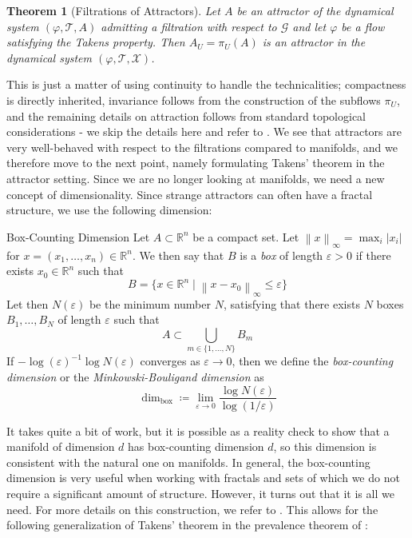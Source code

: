 \documentclass[11pt, a4paper]{memoir}
\theoremstyle{break}
\newtheorem{thm}{Theorem}
\theoremstyle{break}
\theoremstyle{nonumberplain}
\newcommand{\mR}{\mathbb{R}}
\newcommand{\norm}[1]{\left\lVert#1\right\rVert}
\begin{document}
\begin{thm}[Filtrations of Attractors]
Let $A$ be an attractor of the dynamical system $(\varphi, \mathcal{T}, A)$ admitting a filtration with respect to $\mathcal{G}$ and let $\varphi$ be a flow satisfying the Takens property. Then $A_U=\pi_U(A)$ is an attractor in the dynamical system $(\varphi, \mathcal{T},\mathcal{X})$.
\end{thm}
This is just a matter of using continuity to handle the technicalities; compactness is directly inherited, invariance follows from the construction of the subflows $\pi_U$, and the remaining details on attraction follows from standard topological considerations - we skip the details here and refer to \cite{mathFound}. We see that attractors are very well-behaved with respect to the filtrations compared to manifolds, and we therefore move to the next point, namely formulating Takens' theorem in the attractor setting. Since we are no longer looking at manifolds, we need a new concept of dimensionality. Since strange attractors can often have a fractal structure, we use the following dimension:
\begin{mydefinition}{Box-Counting Dimension}
Let $A\subset \mR^n$ be a compact set. Let $\norm{x}_{\infty}=\max_ i |x_i|$ for $x=(x_1,\ldots,x_n)\in \mR^n$. We then say that $B$ is a \emph{box} of length $\varepsilon>0$ if there exists $x_0\in \mR^n$ such that $$B=\{x\in \mR^n\mid \norm{x-x_0}_{\infty}\leqslant \varepsilon \}$$
Let then $N(\varepsilon)$ be the minimum number $N$, satisfying that there exists $N$ boxes $B_1,\ldots,B_N$ of length $\varepsilon$ such that
$$A\subset \bigcup_{m\in\{1,\ldots,N\}} B_m$$
If $-\log(\varepsilon)^{-1}\log N(\varepsilon)$
converges as $\varepsilon \to 0$, then we define the \emph{box-counting dimension} or the \emph{Minkowski-Bouligand dimension} as
$$\dim_{\text{box}}\coloneqq \lim_{\varepsilon\to 0}\frac{\log N(\varepsilon)}{\log(1/\varepsilon)}$$
\end{mydefinition}
It takes quite a bit of work, but it is possible as a reality check to show that a manifold of dimension $d$ has box-counting dimension $d$, so this dimension is consistent with the natural one on manifolds. In general, the box-counting dimension is very useful when working with fractals and sets of which we do not require a significant amount of structure. However, it turns out that it is all we need. For more details on this construction, we refer to \cite{Fractals}. This allows for the following generalization of Takens' theorem in the prevalence theorem of \cite{Sauer1991}:
\end{document}
